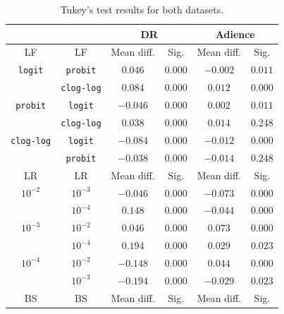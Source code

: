 \documentclass[preprint]{elsarticle}
\begin{document}
\begin{table}[!t]
	\caption{Tukey's test results for both datasets.}
	\label{table:Tukey}
	\centering
	\footnotesize
		\begin{tabular}{cccccc}
			\hline\hline
			&                   & \multicolumn{2}{c}{\textbf{DR}} & \multicolumn{2}{c}{\textbf{Adience}} \\ \hline
			LF         &        LF         & Mean diff. &        Sig.        & Mean diff. &          Sig.           \\ \hline
			\texttt{logit}   &  \texttt{probit}  &  $0.046$   &      $0.000$       &  $-0.002$  &         $0.011$         \\
			& \texttt{clog-log} &  $0.084$   &      $0.000$       &  $0.012$   &         $0.000$         \\
			\texttt{probit}  &  \texttt{logit}   &  $-0.046$  &      $0.000$       &  $0.002$   &         $0.011$         \\
			& \texttt{clog-log} &  $0.038$   &      $0.000$       &  $0.014$   &         $0.248$         \\
			\texttt{clog-log} &  \texttt{logit}   &  $-0.084$  &      $0.000$       &  $-0.012$  &         $0.000$         \\
			&  \texttt{probit}  &  $-0.038$  &      $0.000$       &  $-0.014$  &         $0.248$         \\ \hline\hline
			LR         &        LR         & Mean diff. &        Sig.        & Mean diff. &          Sig.           \\ \hline
			$10^{-2}$     &     $10^{-3}$     &  $-0.046$  &      $0.000$       &  $-0.073$  &         $0.000$         \\
			&     $10^{-4}$     &  $0.148$   &      $0.000$       &  $-0.044$  &         $0.000$         \\
			$10^{-3}$     &     $10^{-2}$     &  $0.046$   &      $0.000$       &  $0.073$   &         $0.000$         \\
			&     $10^{-4}$     &  $0.194$   &      $0.000$       &  $0.029$   &         $0.023$         \\
			$10^{-4}$     &     $10^{-2}$     &  $-0.148$  &      $0.000$       &  $0.044$   &         $0.000$         \\
			&     $10^{-3}$     &  $-0.194$  &      $0.000$       &  $-0.029$  &         $0.023$         \\ \hline\hline
			BS         &        BS         & Mean diff. &        Sig.        & Mean diff. &          Sig.           \\ \hline

\end{tabular}
\end{table}
\end{document}
